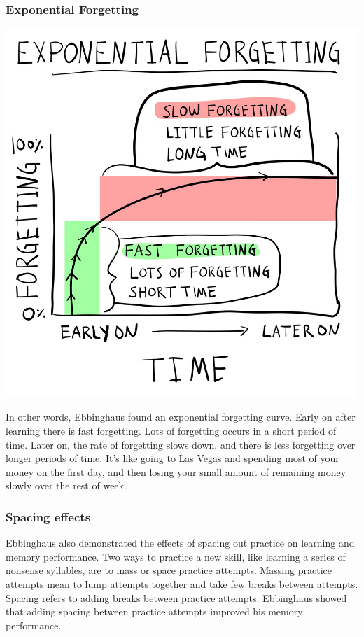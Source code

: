 \documentclass[
  oneside,
  12pt]{crumpbook}
\newenvironment{floatright50}{%
  \wrapfigure{R}{.5\textwidth}%
  }{%
  \endwrapfigure}
\begin{document}
\hypertarget{exponential-forgetting}{%
\subsubsection{Exponential Forgetting}\label{exponential-forgetting}}

\begin{floatright50}
\includegraphics[width=1\linewidth]{imgs/Ebbinghaus_exp}

\end{floatright50}

In other words, Ebbinghaus found an exponential forgetting curve. Early on after learning there is fast forgetting. Lots of forgetting occurs in a short period of time. Later on, the rate of forgetting slows down, and there is less forgetting over longer periods of time. It's like going to Las Vegas and spending most of your money on the first day, and then losing your small amount of remaining money slowly over the rest of week.

\hypertarget{spacing-effects}{%
\subsubsection{Spacing effects}\label{spacing-effects}}

Ebbinghaus also demonstrated the effects of spacing out practice on learning and memory performance. Two ways to practice a new skill, like learning a series of nonsense syllables, are to mass or space practice attempts. Massing practice attempts mean to lump attempts together and take few breaks between attempts. Spacing refers to adding breaks between practice attempts. Ebbinghaus showed that adding spacing between practice attempts improved his memory performance.
\end{document}
